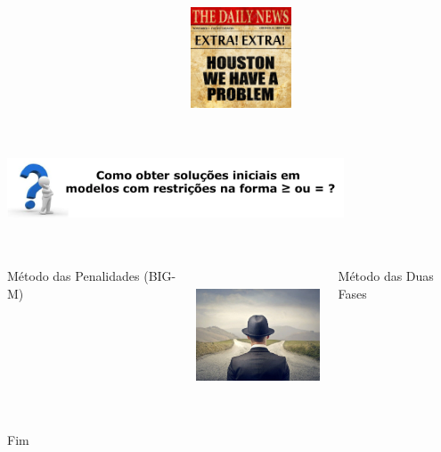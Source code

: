 \documentclass{beamer}
\begin{document}
\begin{frame}
\begin{columns}
\begin{column}{0.5\textwidth}
		\end{column} \pause
		\begin{column}{0.5\textwidth}
			\centering
			\includegraphics[width=3cm,height=3cm]{houston.jpg}
		\end{column}
	\end{columns}
\end{frame}

\begin{frame}
	\centering
	\includegraphics[width=10cm,height=3cm]{Pergunta_Final.png} \pause
	\begin{columns}
		\begin{column}{0.33\textwidth}
				\begin{mdframed}[backgroundcolor=green!80]
					\centering
					Método das Penalidades (BIG-M)
				\end{mdframed}		
		\end{column}
		\begin{column}{0.33\textwidth}
			\centering
			\includegraphics[width=4cm,height=4cm]{twoways.jpg}
		\end{column}
		\hspace{0.2cm}
		\begin{column}{0.33\textwidth}
				\begin{mdframed}[backgroundcolor=green!80]
					\centering
					Método das Duas Fases
				\end{mdframed}		
		\end{column}
	\end{columns}
\end{frame}


\begin{frame}
\Huge{\centerline{Fim}}
\end{frame}

\end{document}
